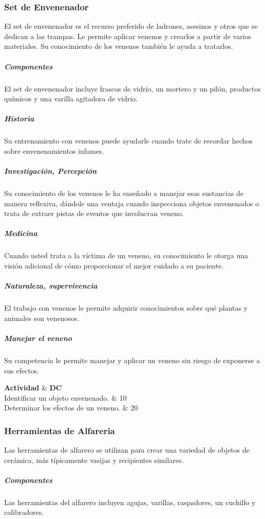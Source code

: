 \documentclass[a4paper,twocolumn,openany,10pt]{dndbook}
\begin{document}
\subsubsection*{Set de Envenenador}
El set de envenenador es el recurso preferido de ladrones, asesinos y otros que se dedican a las trampas. Le permite aplicar
venenos y crearlos a partir de varios materiales. Su conocimiento de los venenos también le ayuda a tratarlos.

\subparagraph{Componentes} El set de envenenador incluye frascos de vidrio, un mortero y un pilón, productos químicos y una
varilla agitadora de vidrio.

\subparagraph{Historia} Su entrenamiento con venenos puede ayudarle cuando trate de recordar hechos sobre envenenamientos infames.

\subparagraph{Investigación, Percepción} Su conocimiento de los venenos le ha enseñado a manejar esas sustancias de manera
reflexiva, dándole una ventaja cuando inspecciona objetos envenenados o trata de extraer pistas de eventos que involucran veneno.

\subparagraph{Medicina} Cuando usted trata a la víctima de un veneno, su conocimiento le otorga una visión adicional de cómo
proporcionar el mejor cuidado a su paciente.

\subparagraph{Naturaleza, supervivencia} El trabajo con venenos le permite adquirir conocimientos sobre qué plantas y animales
son venenosos.

\subparagraph{Manejar el veneno} Su competencia le permite manejar y aplicar un veneno sin riesgo de exponerse a sus efectos. 
 
\begin{dndtable}[Xc]
	\textbf{Actividad}							& \textbf{DC}	\\
	Identificar un objeto envenenado.			& 10	\\
	Determinar los efectos de un veneno.		& 20	\\
\end{dndtable}

\subsubsection*{Herramientas de Alfareria}
Las herramientas de alfarero se utilizan para crear una variedad de objetos de cerámica, más típicamente vasijas y recipientes
similares.

\subparagraph{Componentes} Las herramientas del alfarero incluyen agujas, varillas, raspadores, un cuchillo y calibradores.
\end{document}
